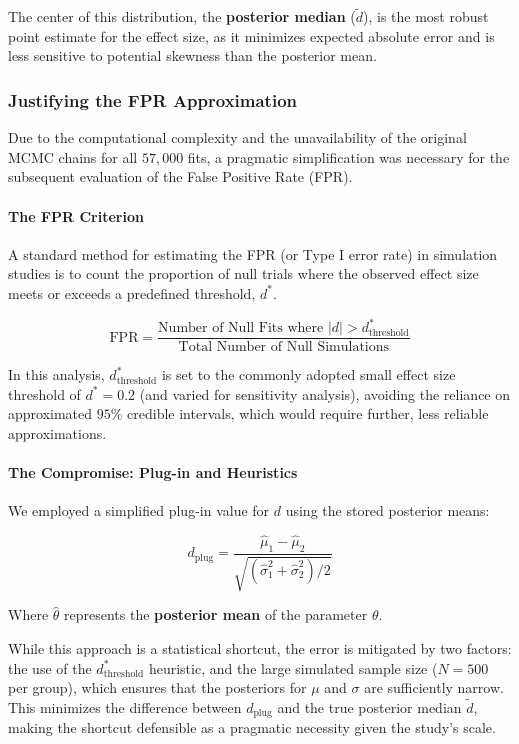 \documentclass[preview]{article}
\begin{document}
The center of this distribution, the \textbf{posterior median} ($\tilde{d}$), is the most robust point estimate for the effect size, as it minimizes expected absolute error and is less sensitive to potential skewness than the posterior mean.

\subsubsection{Justifying the FPR Approximation}

Due to the computational complexity and the unavailability of the original MCMC chains for all $57,000$ fits, a pragmatic simplification was necessary for the subsequent evaluation of the False Positive Rate (FPR).

\paragraph{The FPR Criterion}

A standard method for estimating the FPR (or Type I error rate) in simulation studies is to count the proportion of null trials where the observed effect size meets or exceeds a predefined threshold, $d^*$.

$$\text{FPR} = \frac{\text{Number of Null Fits where } |d| > d^*_{\text{threshold}}}{\text{Total Number of Null Simulations}}$$

In this analysis, $d^*_{\text{threshold}}$ is set to the commonly adopted small effect size threshold of $d^*=0.2$ (and varied for sensitivity analysis), avoiding the reliance on approximated $95\%$ credible intervals, which would require further, less reliable approximations.

\paragraph{The Compromise: Plug-in and Heuristics}

We employed a simplified plug-in value for $d$ using the stored posterior means:

$$d_{\text{plug}} = \frac{\hat{\mu}_1 - \hat{\mu}_2}{\sqrt{(\hat{\sigma}_1^2 + \hat{\sigma}_2^2)/2}}$$

Where $\hat{\theta}$ represents the \textbf{posterior mean} of the parameter $\theta$.

While this approach is a statistical shortcut, the error is mitigated by two factors: the use of the $d^*_{\text{threshold}}$ heuristic, and the large simulated sample size ($N=500$ per group), which ensures that the posteriors for $\mu$ and $\sigma$ are sufficiently narrow. This minimizes the difference between $d_{\text{plug}}$ and the true posterior median $\tilde{d}$, making the shortcut defensible as a pragmatic necessity given the study's scale.
\end{document}
